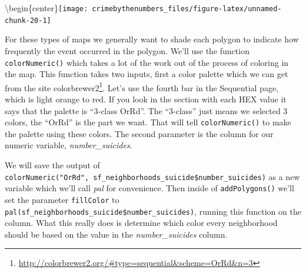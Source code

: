 \documentclass[
]{krantz}
\makeatletter
\newenvironment{Shaded}{\begin{snugshade}}{\end{snugshade}}
\newcommand{\AttributeTok}[1]{\textcolor[rgb]{0.61,0.61,0.61}{#1}}
\newcommand{\DecValTok}[1]{\textcolor[rgb]{0.06,0.06,0.06}{#1}}
\newcommand{\FunctionTok}[1]{\textcolor[rgb]{0,0,0}{#1}}
\newcommand{\NormalTok}[1]{#1}
\newcommand{\OtherTok}[1]{\textcolor[rgb]{0.37,0.37,0.37}{#1}}
\newcommand{\SpecialCharTok}[1]{\textcolor[rgb]{0,0,0}{#1}}
\newcommand{\StringTok}[1]{\textcolor[rgb]{0.5,0.5,0.5}{#1}}
\renewcommand{\href}[2]{#2\footnote{\url{#1}}}
\newenvironment{kframe}{%
\medskip{}
\setlength{\fboxsep}{.8em}
 \def\at@end@of@kframe{}%
 \ifinner\ifhmode%
  \def\at@end@of@kframe{\end{minipage}}%
  \begin{minipage}{\columnwidth}%
 \fi\fi%
 \def\FrameCommand##1{\hskip\@totalleftmargin \hskip-\fboxsep
 \colorbox{shadecolor}{##1}\hskip-\fboxsep
     \hskip-\linewidth \hskip-\@totalleftmargin \hskip\columnwidth}%
 \MakeFramed {\advance\hsize-\width
   \@totalleftmargin\z@ \linewidth\hsize
   \@setminipage}}%
 {\par\unskip\endMakeFramed%
 \at@end@of@kframe}
\renewenvironment{Shaded}{\begin{kframe}}{\end{kframe}}
\makeatother
\begin{document}
\textbackslash begin\{center\}\texttt{[image: crimebythenumbers\_files/figure-latex/unnamed-chunk-20-1]}

For these types of maps we generally want to shade each polygon to indicate how frequently the event occurred in the polygon. We'll use the function \texttt{colorNumeric()} which takes a lot of the work out of the process of coloring in the map. This function takes two inputs, first a color palette which we can get from the site \href{http://colorbrewer2.org/\#type=sequential\&scheme=OrRd\&n=3}{colorbrewer2}. Let's use the fourth bar in the Sequential page, which is light orange to red. If you look in the section with each HEX value it says that the palette is ``3-class OrRd''. The ``3-class'' just means we selected 3 colors, the ``OrRd'' is the part we want. That will tell \texttt{colorNumeric()} to make the palette using these colors. The second parameter is the column for our numeric variable, \emph{number\_suicides}.

We will save the output of \texttt{colorNumeric("OrRd",\ sf\_neighborhoods\_suicide\$number\_suicides)} as a new variable which we'll call \emph{pal} for convenience. Then inside of \texttt{addPolygons()} we'll set the parameter \texttt{fillColor} to \texttt{pal(sf\_neighborhoods\_suicide\$number\_suicides)}, running this function on the column. What this really does is determine which color every neighborhood should be based on the value in the \emph{number\_suicides} column.

\begin{Shaded}
\end{Shaded}
\end{document}

